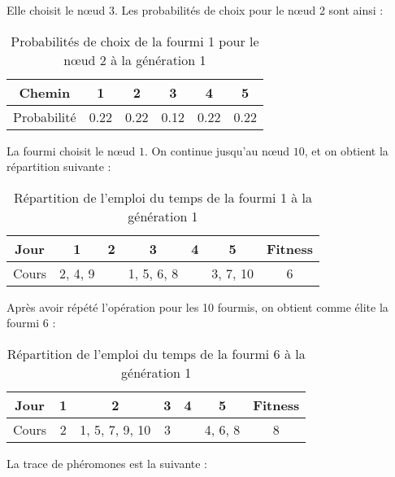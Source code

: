Elle choisit le n\oe ud $3$.
Les probabilités de choix pour le n\oe ud 2 sont ainsi :

\begin{table}[h!]
    \centering
    \begin{tabular}{|c|c|c|c|c|c|}
        \hline
        Chemin      & 1    & 2    & 3    & 4    & 5    \\
        \hline
        Probabilité & 0.22 & 0.22 & 0.12 & 0.22 & 0.22 \\
        \hline
    \end{tabular}
    \caption{Probabilités de choix de la fourmi 1 pour le n\oe ud 2 à la génération 1}\label{tab:voeux-etudiant-2}
\end{table}

La fourmi choisit le n\oe ud $1$.
On continue jusqu'au n\oe ud $10$, et on obtient la répartition suivante :

\begin{table}[H]
    \centering
    \begin{tabular}{|c|c|c|c|c|c|c|}
        \hline
        Jour  & 1       & 2 & 3          & 4 & 5        & Fitness \\
        \hline
        Cours & 2, 4, 9 &   & 1, 5, 6, 8 &   & 3, 7, 10 & 6       \\
        \hline
    \end{tabular}
    \caption{Répartition de l'emploi du temps de la fourmi 1 à la génération 1}\label{tab:voeux-etudiant-3}
\end{table}

Après avoir répété l'opération pour les 10 fourmis, on obtient comme élite la fourmi 6 :

\begin{table}[!h]
    \centering
    \begin{tabular}{|c|c|c|c|c|c|c|}
        \hline
        Jour  & 1 & 2              & 3 & 4 & 5       & Fitness \\
        \hline
        Cours & 2 & 1, 5, 7, 9, 10 & 3 &   & 4, 6, 8 & 8       \\
        \hline
    \end{tabular}
    \caption{Répartition de l'emploi du temps de la fourmi 6 à la génération 1}\label{tab:voeux-etudiant-4}
\end{table}

La trace de phéromones est la suivante :

